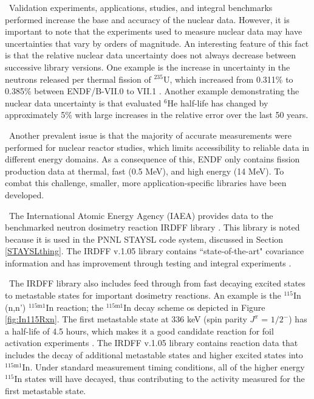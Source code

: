 \ Validation experiments, applications, studies, and integral benchmarks performed increase the base and accuracy of the nuclear data\cite{Brown2015}.
However, it is important to note that the experiments used to measure nuclear data may have uncertainties that vary by orders of magnitude. An interesting feature of this fact is that the relative nuclear data uncertainty does not always decrease between successive library versions. One example is the increase in uncertainty in the neutrons released per thermal fission of $^{235}$U, which increased from 0.311\% to 0.385\% between ENDF/B-VII.0 to VII.1 \cite{Bostelmann2017}. Another example demonstrating the nuclear data uncertainty is that evaluated $\mathrm{^{6}}$He half-life has changed by approximately 5\% with large increases in the relative error over the last 50 years\cite{he6}.

\  Another prevalent issue is that the majority of accurate measurements were performed for nuclear reactor studies, which limits accessibility to reliable data in different energy domains. As a consequence of this, ENDF only contains fission production data at thermal, fast (0.5 MeV), and high energy (14 MeV). To combat this challenge, smaller, more application-specific libraries have been developed. 

\ The International Atomic Energy Agency (IAEA) provides data to the benchmarked neutron dosimetry reaction IRDFF library \cite{IRDFF}. This library is noted because it is used in the PNNL STAYSL code system, discussed in Section \ref{STAYSLthing}. The IRDFF v.1.05 library contains ``state-of-the-art" covariance information and has improvement through testing and integral experiments \cite{Greenwood2017}. 

\ The IRDFF library also includes feed through from fast decaying excited states to metastable states for important dosimetry reactions. An example is the $\mathrm{^{115}}$In (n,n') $\mathrm{^{115m1}}$In reaction; the $\mathrm{^{115m1}}$In decay scheme os depicted in Figure \ref{fig:In115Rxn}. 
The first metastable state at 336 keV (spin parity $J^{\pi}$ = $1/2^{-}$) has a half-life of 4.5 hours, which makes it a good candidate reaction for foil activation experiments \cite{Zolotarev2013}. 
The IRDFF v.1.05 library contains reaction data that includes the decay of additional metastable states and higher excited states into $\mathrm{^{115m1}}$In. 
Under standard measurement timing conditions, all of the higher energy $\mathrm{^{115}}$In states will have decayed, thus contributing to the activity measured for the first metastable state. 

